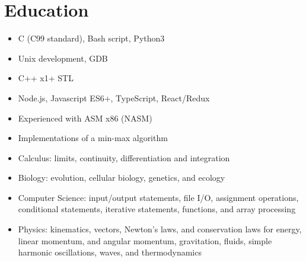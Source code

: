 \section{Education}

\begin{minipage}{.15\textwidth}
    \centerline{}
\end{minipage}%
\hspace{5mm}
\begin{minipage}{.9\textwidth}
    \raggedright
    \begin{minipage}[t]{.8\textwidth}
        \begin{itemize}
            \item C (C99 standard), Bash script, Python3
            \item Unix development, GDB
            \item C++ x1+ STL
            \item Node.js, Javascript ES6+, TypeScript, React/Redux
            \item Experienced with ASM x86 (NASM)
            \item Implementations of a min-max algorithm
        \end{itemize}
    \end{minipage}
\end{minipage}
\begin{minipage}{.15\textwidth}
    \centerline{}
\end{minipage}%
\hspace{5mm}
\begin{minipage}{.9\textwidth}
    \raggedright
    \begin{minipage}[t]{.8\textwidth}
        \begin{itemize}
            \item Calculus: limits, continuity, differentiation and integration
            \item Biology: evolution, cellular biology, genetics, and ecology
            \item Computer Science: input/output statements, file I/O, assignment operations, conditional statements, iterative statements, functions, and array processing
            \item Physics: kinematics, vectors, Newton's laws, and conservation laws for energy, linear momentum, and angular momentum, gravitation, fluids, simple harmonic oscillations, waves, and thermodynamics
        \end{itemize}
    \end{minipage}
\end{minipage}
